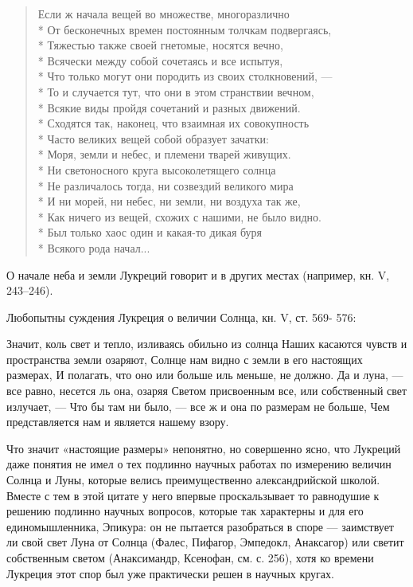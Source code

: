 \begin{verse} Если  ж начала  вещей во множестве,  многоразлично\\* От
бесконечных времен  постоянным толчкам подвергаясь,\\*  Тяжестью также
своей гнетомые, носятся вечно,\\* Всячески между собой сочетаясь и все
испытуя,\\*  Что  только могут  они  породить  из своих  столкновений,
---\\* То и случается тут, что они в этом странствии вечном,\\* Всякие
виды  пройдя сочетаний  и разных  движений.\\* Сходятся  так, наконец,
что  взаимная их  совокупность\\* Часто  великих вещей  собой образует
зачатки:\\*  Моря, земли  и  небес, и  племени  тварей живущих.\\*  Ни
светоносного круга  высоколетящего солнца\\* Не различалось  тогда, ни
созвездий великого мира\\* И ни морей,  ни небес, ни земли, ни воздуха
так же,\\* Как ничего из вещей, схожих с нашими, не было видно.\\* Был
только  хаос  один и  какая-то  дикая  буря\\* Всякого  рода  начал...
\end{verse}

О начале  неба и земли Лукреций  говорит и в других  местах (например,
кн. V, 243--246).

Любопытны суждения Лукреция о величии Солнца, кн. V, ст. 569- 576:

Значит, коль свет и тепло,  изливаясь обильно из солнца Наших касаются
чувств и  пространства земли озаряют, Солнце  нам видно с земли  в его
настоящих  размерах, И  полагать, что  оно или  больше иль  меньше, не
должно.  Да и  луна,  --- все  равно, несется  ль  она, озаряя  Светом
присвоенным  все, или  собственный свет  излучает, ---  Что бы  там ни
было, --- все ж и она по  размерам не больше, Чем представляется нам и
является нашему взору.

Что  значит «настоящие  размеры»  непонятно, но  совершенно ясно,  что
Лукреций  даже понятия  не  имел  о тех  подлинно  научных работах  по
измерению  величин  Солнца  и  Луны,  которые  велись  преимущественно
александрийской  школой. Вместе  с тем  в этой  цитате у  него впервые
проскальзывает  то равнодушие  к  решению  подлинно научных  вопросов,
которые  так характерны  и  для его  единомышленника,  Эпикура: он  не
пытается  разобраться в  споре ---  заимствует  ли свой  свет Луна  от
Солнца (Фалес,  Пифагор, Эмпедокл,  Анаксагор) или  светит собственным
светом (Анаксимандр, Ксенофан,  см. с. 256), хотя  ко времени Лукреция
этот спор был уже практически решен в научных кругах.


